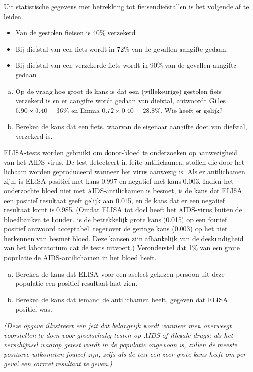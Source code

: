 \documentclass[12pt,twoside]{article}
\begin{document}
\begin{oefening} %
Uit statistische gegevens met betrekking tot fietsendiefstallen is het volgende af te leiden.
\begin{itemize}
  \item Van de gestolen fietsen is 40\% verzekerd
  \item Bij diefstal van een fiets wordt in 72\% van de gevallen aangifte gedaan.
  \item Bij diefstal van een verzekerde fiets wordt in 90\% van de gevallen aangifte gedaan.
\end{itemize}
\begin{enumerate}[(a)]
  \item Op de vraag hoe groot de kans is dat een (willekeurige) gestolen fiets verzekerd is en er aangifte wordt gedaan van diefstal, antwoordt Gilles $0.90\times0.40 = 36\%$ en Emma $0.72\times0.40 = 28.8\%$. Wie heeft er gelijk? 
  \item Bereken de kans dat een fiets, waarvan de eigenaar aangifte doet van diefstal, verzekerd is.
\end{enumerate}
\end{oefening}

\begin{oefening} %
ELISA-tests worden gebruikt om donor-bloed te onderzoeken op aanwezigheid van het AIDS-virus. De test detecteert in feite antilichamen, stoffen die door het lichaam worden geproduceerd wanneer het virus aanwezig is. Als er antilichamen zijn, is ELISA positief met kans 0.997 en negatief met kans 0.003. Indien het onderzochte bloed niet met AIDS-antilichamen is besmet, is de kans dat ELISA een positief resultaat geeft gelijk aan 0.015, en de kans dat er een negatief resultaat komt is 0.985. (Omdat ELISA tot doel heeft het AIDS-virus buiten de bloedbanken te houden, is de betrekkelijk grote kans (0.015) op een foutief positief antwoord acceptabel, tegenover de geringe kans (0.003) op het niet herkennen van besmet bloed. Deze kansen zijn afhankelijk van de deskundigheid van het laboratorium dat de tests uitvoert.) Veronderstel dat 1\% van een grote populatie de AIDS-antilichamen in het bloed heeft.
\begin{enumerate}[(a)]
  \item Bereken de kans dat ELISA voor een aselect gekozen persoon uit deze populatie een positief resultaat laat zien.
  \item Bereken de kans dat iemand de antilichamen heeft, gegeven dat ELISA positief was.
\end{enumerate}
{\em (Deze opgave illustreert een feit dat belangrijk wordt wanneer men overweegt voorstellen te doen voor grootschalig testen op AIDS of illegale drugs: als het verschijnsel waarop getest wordt in de populatie ongewoon is, zullen de meeste positieve uitkomsten foutief zijn, zelfs als de test een zeer grote kans heeft om per geval een corrcet resultaat te geven.)}
\end{oefening}
\end{document}
